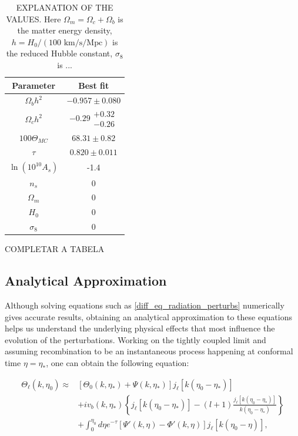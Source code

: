 \documentclass[openany,a4paper,12pt,oneside]{book}
\begin{document}
\begin{spacing}{1.5}
\begin{table}[!htb]
    \centering
    \begin{tabular}{cc} \hline
     Parameter & Best fit \\ \hline
     $\Omega_b h^2$ & $-0.957\pm0.080$\\
     $\Omega_c h^2$ & $-0.29\substack{+0.32 \\ -0.26}$\\
     $100\Theta_{MC}$ & $68.31\pm0.82$ \\
     $\tau$ & $0.820\pm 0.011$\\ 
     $\ln{(10^{10}A_s)}$ & -1.4 \\ 
     $n_s$ & 0 \\ \hline
     $\Omega_m$ & 0 \\
     $H_0$ & 0 \\
     $\sigma_8$ & 0 \\ \hline
    \end{tabular}
    \caption{EXPLANATION OF THE VALUES. Here $\Omega_m=\Omega_c+\Omega_b$ is the matter energy density, $h=H_0/(100\text{ km/s/Mpc})$ is the reduced Hubble constant, $\sigma_8$ is ...}
    \label{tab:planck_CPL}
\end{table}

COMPLETAR A TABELA

\subsection{Analytical Approximation}

Although solving equations such as \eqref{diff_eq_radiation_perturbs} numerically gives accurate results, obtaining an analytical approximation to these equations helps us understand the underlying physical effects that most influence the evolution of the perturbations. Working on the tightly coupled limit and assuming recombination to be an instantaneous process happening at conformal time $\eta=\eta_*$, one can obtain the following equation\cite{dodelson2020modern}:

\begin{equation}\label{ch2:Thetal_approx}
\begin{split}
    \Theta_\ell(k,\eta_0)\approx &[\Theta_0(k,\eta_*)+\Psi(k,\eta_*)]j_\ell[k(\eta_0-\eta_*)]\\
    &+iv_b(k,\eta_*)\left\{j_\ell[k(\eta_0-\eta_*)]-(l+1)\frac{j_\ell[k(\eta_0-\eta_*)]}{k(\eta_0-\eta_*)}\right\}\\
    &+\int_0^{\eta_0} d\eta e^{-\tau}[\Psi'(k,\eta)-\Phi'(k,\eta)]j_\ell[k(\eta_0-\eta)],
\end{split}
\end{equation}


\end{spacing}
\end{document}
